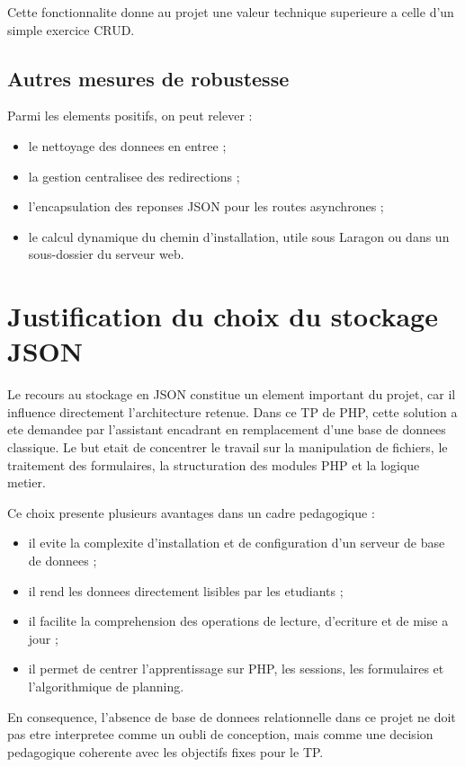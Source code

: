 \documentclass[12pt,a4paper]{article}
\begin{document}
Cette fonctionnalite donne au projet une valeur technique superieure a celle d'un simple exercice CRUD.

\subsection{Autres mesures de robustesse}
Parmi les elements positifs, on peut relever :
\begin{itemize}
    \item le nettoyage des donnees en entree ;
    \item la gestion centralisee des redirections ;
    \item l'encapsulation des reponses JSON pour les routes asynchrones ;
    \item le calcul dynamique du chemin d'installation, utile sous Laragon ou dans un sous-dossier du serveur web.
\end{itemize}

\section{Justification du choix du stockage JSON}
Le recours au stockage en JSON constitue un element important du projet, car il influence directement l'architecture retenue. Dans ce TP de PHP, cette solution a ete demandee par l'assistant encadrant en remplacement d'une base de donnees classique. Le but etait de concentrer le travail sur la manipulation de fichiers, le traitement des formulaires, la structuration des modules PHP et la logique metier.

Ce choix presente plusieurs avantages dans un cadre pedagogique :
\begin{itemize}
    \item il evite la complexite d'installation et de configuration d'un serveur de base de donnees ;
    \item il rend les donnees directement lisibles par les etudiants ;
    \item il facilite la comprehension des operations de lecture, d'ecriture et de mise a jour ;
    \item il permet de centrer l'apprentissage sur PHP, les sessions, les formulaires et l'algorithmique de planning.
\end{itemize}

En consequence, l'absence de base de donnees relationnelle dans ce projet ne doit pas etre interpretee comme un oubli de conception, mais comme une decision pedagogique coherente avec les objectifs fixes pour le TP.
\end{document}
